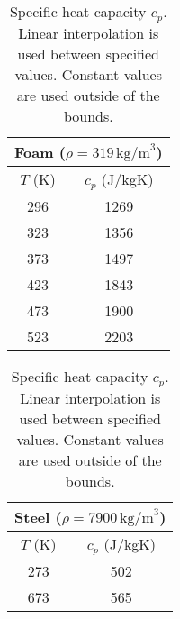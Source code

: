 \documentclass[final]{siamltex}
\begin{document}
\begin{table}[H]
\centering
\begin{tabular}{c|c}
\multicolumn{2}{c}{Foam ($\rho=319\,\mathrm{kg/m}^{3}$)}  \\
\hline
$T$ (K) & $c_p$ (J/kgK) \\
\hline
296 & 1269 \\
323 & 1356 \\
373 & 1497 \\
423 & 1843 \\
473 & 1900 \\
523 & 2203 \\
\end{tabular}\quad
\begin{tabular}{c|c}
\multicolumn{2}{c}{Steel ($\rho=7900\,\mathrm{kg/m}^{3}$)} \\
\hline
$T$ (K) & $c_p$ (J/kgK) \\
\hline
273 & 502 \\
673 & 565 \\
\end{tabular}
\caption{Specific heat capacity $c_p$.  Linear interpolation is used between
  specified values.  Constant values are used outside of the bounds.}
\label{t:cap}
\end{table}




 
\end{document}
